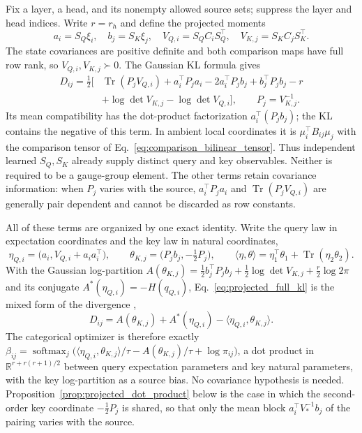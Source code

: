 \documentclass[twoside,11pt]{article}
\newcommand{\softmax}{\operatorname{softmax}}
\begin{document}
Fix a layer, a head, and its nonempty allowed source sets; suppress the layer and head indices. Write $r=r_h$ and define the projected moments
\begin{equation}
a_i=S_Q\xi_i,\quad b_j=S_K\xi_j,\quad
V_{Q,i}=S_QC_iS_Q^\top,\quad V_{K,j}=S_KC_jS_K^\top.
\label{eq:projected_qk_moments}
\end{equation}
The state covariances are positive definite and both comparison maps have full row rank, so $V_{Q,i},V_{K,j}\succ0$. The Gaussian KL formula gives
\begin{align}
D_{ij}=\frac12\bigl[&\operatorname{Tr}(P_jV_{Q,i})
+a_i^\top P_ja_i-2a_i^\top P_jb_j+b_j^\top P_jb_j-r\nonumber\\
&+\log\det V_{K,j}-\log\det V_{Q,i}\bigr],
\qquad P_j=V_{K,j}^{-1}.
\label{eq:projected_full_kl}
\end{align}
Its mean compatibility has the dot-product factorization $a_i^\top(P_jb_j)$; the KL contains the negative of this term. In ambient local coordinates it is $\mu_i^\top B_{ij}\mu_j$ with the comparison tensor of Eq.~\eqref{eq:comparison_bilinear_tensor}. Thus independent learned $S_Q,S_K$ already supply distinct query and key observables. Neither is required to be a gauge-group element. The other terms retain covariance information: when $P_j$ varies with the source, $a_i^\top P_ja_i$ and $\operatorname{Tr}(P_jV_{Q,i})$ are generally pair dependent and cannot be discarded as row constants.

All of these terms are organized by one exact identity. Write the query law in expectation coordinates and the key law in natural coordinates,
\begin{equation}
\eta_{Q,i}=\bigl(a_i,V_{Q,i}+a_ia_i^\top\bigr),\qquad
\theta_{K,j}=\bigl(P_jb_j,-\tfrac12P_j\bigr),\qquad
\langle\eta,\theta\rangle=\eta_1^\top\theta_1+\operatorname{Tr}(\eta_2\theta_2).
\end{equation}
With the Gaussian log-partition $A(\theta_{K,j})=\tfrac12b_j^\top P_jb_j+\tfrac12\log\det V_{K,j}+\tfrac r2\log2\pi$ and its conjugate $A^*(\eta_{Q,i})=-H(q_{Q,i})$, Eq.~\eqref{eq:projected_full_kl} is the mixed form of the divergence \citep[Sec.~5.2, Eq.~(5.11)]{Wainwright2008},
\begin{equation}
D_{ij}=A(\theta_{K,j})+A^*(\eta_{Q,i})-\langle\eta_{Q,i},\theta_{K,j}\rangle.
\label{eq:dual_pairing}
\end{equation}
The categorical optimizer is therefore exactly $\beta_{ij}=\softmax_j\bigl(\langle\eta_{Q,i},\theta_{K,j}\rangle/\tau-A(\theta_{K,j})/\tau+\log\pi_{ij}\bigr)$, a dot product in $\mathbb R^{r+r(r+1)/2}$ between query expectation parameters and key natural parameters, with the key log-partition as a source bias. No covariance hypothesis is needed. Proposition~\ref{prop:projected_dot_product} below is the case in which the second-order key coordinate $-\tfrac12P_j$ is shared, so that only the mean block $a_i^\top V_*^{-1}b_j$ of the pairing varies with the source.
\end{document}
